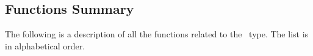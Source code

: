 \subsection{Functions Summary}
\label{mimage-function}

The following is a description of all the functions related to 
the \mimage\ type. The list is in alphabetical order.

\newpage %


